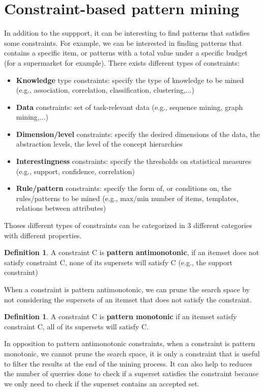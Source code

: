 \documentclass[12pt, openany]{report}
\theoremstyle{definition}
\newtheorem{definition}[thm]{Definition}
\begin{document}
\section{Constraint-based pattern mining}
In addition to the suppport, it can be interesting to find patterns that satisfies some constraints. For example, we can be interested in finding patterns that contains a specific item, or patterns with a total value under a specific budget (for a supermarket for example). There exists different types of constraints:
\begin{itemize}
    \item \textbf{Knowledge} type constraints: specify the type of knowledge to be mined (e.g., association, correlation, classification, clustering,...)
    \item \textbf{Data} constraints: set of task-relevant data (e.g., sequence mining, graph mining,...)
    \item \textbf{Dimension/level} constraints: specify the desired dimensions of the data, the abstraction levels, the level of the concept hierarchies
    \item \textbf{Interestingness} constraints: specify the thresholds on statistical measures (e.g., support, confidence, correlation)
    \item \textbf{Rule/pattern} constraints: specify the form of, or conditions on, the rules/patterns to be mined (e.g., max/min number of items, templates, relations between attributes)
\end{itemize}
Thoses different types of constraints can be categorized in 3 different categories with different properties.
\begin{definition}
    A constraint C is \textbf{pattern antimonotonic}, if an itemset does not satisfy constraint C, none of its supersets will satisfy C (e.g., the support constraint)
\end{definition}
When a constraint is pattern antimonotonic, we can prune the search space by not considering the supersets of an itemset that does not satisfy the constraint.
\begin{definition}
    A constraint C is \textbf{pattern monotonic} if an itemset satisfy constraint C, all of its supersets will satisfy C.
\end{definition}
In opposition to pattern antimonotonic constraints, when a constraint is pattern monotonic, we cannot prune the search space, it is only a constraint that is useful to filter the results at the end of the mining process. It can also help to reduces the number of querries done to check if a superset satisfies the constraint because we only need to check if the superset contains an accepted set.
\end{document}
